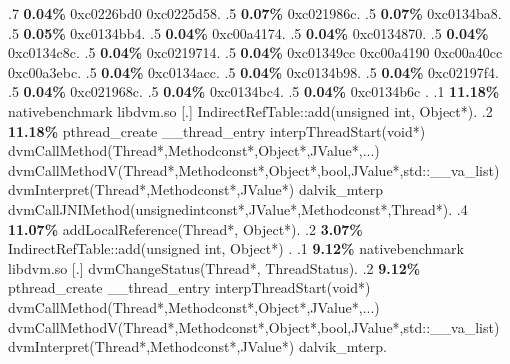 \begin{profile}
{.7 \textbf{0.04\%} 0xc0226bd0\newline {} 0xc0225d58. 
.5 \textbf{0.07\%} 0xc021986c. 
.5 \textbf{0.07\%} 0xc0134ba8. 
.5 \textbf{0.05\%} 0xc0134bb4. 
.5 \textbf{0.04\%} 0xc00a4174. 
.5 \textbf{0.04\%} 0xc0134870. 
.5 \textbf{0.04\%} 0xc0134c8c. 
.5 \textbf{0.04\%} 0xc0219714. 
.5 \textbf{0.04\%} 0xc01349cc\newline {} 0xc00a4190\newline {} 0xc00a40cc\newline {} 0xc00a3ebc. 
.5 \textbf{0.04\%} 0xc0134acc. 
.5 \textbf{0.04\%} 0xc0134b98. 
.5 \textbf{0.04\%} 0xc02197f4. 
.5 \textbf{0.04\%} 0xc021968c. 
.5 \textbf{0.04\%} 0xc0134bc4. 
.5 \textbf{0.04\%} 0xc0134b6c\newline {} . 
.1 \textbf{11.18\%} nativebenchmark  libdvm.so              [.] IndirectRefTable::add(unsigned int, Object*). 
.2 \textbf{11.18\%} pthread\_create\newline {} \_\_thread\_entry\newline {} interpThreadStart(void*)\newline {} dvmCallMethod(Thread*,Methodconst*,Object*,JValue*,...)\newline {} dvmCallMethodV(Thread*,Methodconst*,Object*,bool,JValue*,std::\_\_va\_list)\newline {} dvmInterpret(Thread*,Methodconst*,JValue*)\newline {} dalvik\_mterp\newline {} dvmCallJNIMethod(unsignedintconst*,JValue*,Methodconst*,Thread*). 
.4 \textbf{11.07\%} addLocalReference(Thread*, Object*). 
.2 \textbf{3.07\%} IndirectRefTable::add(unsigned int, Object*)\newline {} . 
.1 \textbf{ 9.12\%} nativebenchmark  libdvm.so              [.] dvmChangeStatus(Thread*, ThreadStatus). 
.2 \textbf{9.12\%} pthread\_create\newline {} \_\_thread\_entry\newline {} interpThreadStart(void*)\newline {} dvmCallMethod(Thread*,Methodconst*,Object*,JValue*,...)\newline {} dvmCallMethodV(Thread*,Methodconst*,Object*,bool,JValue*,std::\_\_va\_list)\newline {} dvmInterpret(Thread*,Methodconst*,JValue*)\newline {} dalvik\_mterp. 
}
\end{profile}
